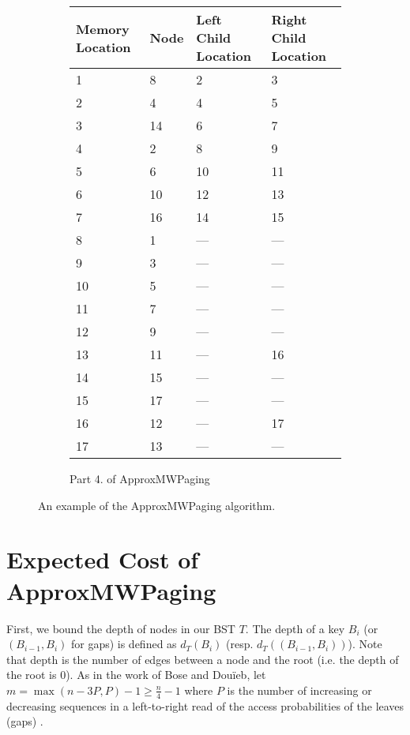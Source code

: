 \documentclass[letterpaper,12pt,titlepage,oneside,final]{book}
\theoremstyle{plain}
\begin{document}
\begin{figure}[H]
\begin{center}
\begin{subfigure}[b]{0.72\textwidth}
\begin{center}
    \begin{tabular}{ | l | l | l | p{5cm} |}
    \hline
    Memory Location & Node & Left Child Location & Right Child Location \\ \hline
    1  & 8  & 2    & 3    \\ \hline
    2  & 4  & 4    & 5    \\ \hline
    3  & 14 & 6    & 7    \\ \hline
    4  & 2  & 8    & 9    \\ \hline
    5  & 6  & 10   & 11   \\ \hline
    6  & 10 & 12   & 13   \\ \hline
    7  & 16 & 14   & 15   \\ \hline
    8  & 1  & --- & --- \\ \hline
    9  & 3  & --- & --- \\ \hline
    10 & 5  & --- & --- \\ \hline
    11 & 7  & --- & --- \\ \hline
    12 & 9  & --- & --- \\ \hline
    13 & 11 & --- & 16   \\ \hline
    14 & 15 & --- & --- \\ \hline
    15 & 17 & --- & --- \\ \hline
    16 & 12 & --- & 17   \\ \hline
    17 & 13 & --- & --- \\ \hline
    \end{tabular}
\end{center}

\caption{Part 4. of ApproxMWPaging}
\end{subfigure}
\end{center}


\caption{An example of the ApproxMWPaging algorithm.}
\end{figure}


\section{Expected Cost of ApproxMWPaging} \label{45}

First, we bound the depth of nodes in our BST $T$. The depth of a key $B_i$ (or $(B_{i-1}, B_i)$ for gaps) is defined as $d_T(B_i)$ (resp. $d_T((B_{i-1},B_i))$). Note that depth is the number of edges between a node and the root (i.e. the depth of the root is $0$). As in the work of Bose and Dou\"{i}eb, let $m=\max({n-3P,P})-1 \geq \frac{n}{4} - 1$ where $P$ is the number of increasing or decreasing sequences in a left-to-right read of the access probabilities of the leaves (gaps) \cite{bose2009efficient}.
\end{document}
